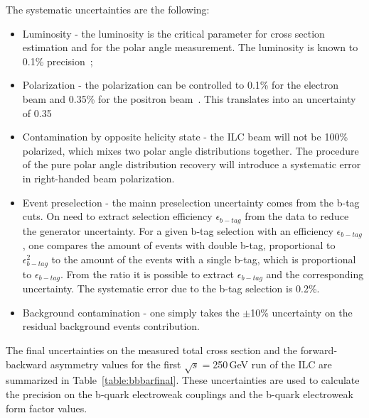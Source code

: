 The systematic uncertainties are the following:
\begin{itemize}
	\item Luminosity - the luminosity is the critical parameter for cross section estimation and for the polar angle measurement. The luminosity is known to 0.1\% precision~\cite{bib:Lumi};
	
	\item Polarization - the polarization can be controlled to 0.1\% for the electron beam and 0.35\% for the positron beam~\cite{bib:ILCPol}. This translates into an uncertainty of 0.35%
	
	\item Contamination by opposite helicity state - the ILC beam will not be 100\% polarized, which mixes two polar angle distributions together. The procedure of the pure polar angle distribution recovery will introduce a systematic error in right-handed beam polarization.  
	
	\item Event preselection -  the mainn preselection uncertainty comes from the b-tag cuts. On need to extract selection efficiency $\epsilon_{b-tag}$ from the data to reduce the generator uncertainty. For a given b-tag selection with an efficiency $\epsilon_{b-tag}$, one compares the amount of events with double b-tag, proportional to $\epsilon_{b-tag}^2$ to the amount of the events with a single b-tag, which is proportional to $\epsilon_{b-tag}$. From the ratio it is possible to extract $\epsilon_{b-tag}$ and the corresponding uncertainty. The systematic error due to the b-tag selection is 0.2\%.
	
	\item Background contamination - one simply takes the $\pm$10\% uncertainty on the residual background events contribution. 
\end{itemize}

The final uncertainties on the measured total cross section and the forward-backward asymmetry values for the first $\sqrt{s}=$250\,GeV run of the ILC are summarized in Table~\ref{table:bbbarfinal}. These uncertainties are used to calculate the precision on the b-quark electroweak couplings and the b-quark electroweak form factor values.


